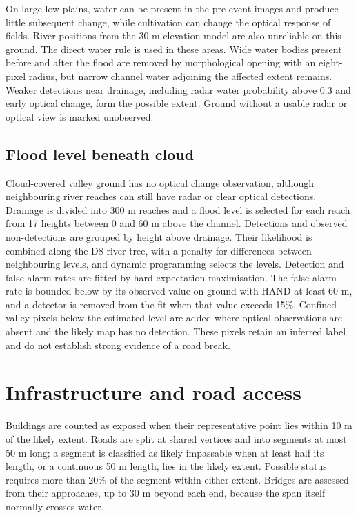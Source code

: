 \documentclass[10pt,twocolumn,letterpaper]{article}
\begin{document}
On large low plains, water can be present in the pre-event images and produce little subsequent
change, while cultivation can change the optical response of fields. River positions from the 30 m
elevation model are also unreliable on this ground. The direct water rule is used in these areas.
Wide water bodies present before and after the flood are removed by morphological opening with an
eight-pixel radius, but narrow channel water adjoining the affected extent remains. Weaker
detections near drainage, including radar water probability above 0.3 and early optical change, form
the possible extent. Ground without a usable radar or optical view is marked unobserved.

\subsection{Flood level beneath cloud}
Cloud-covered valley ground has no optical change observation, although neighbouring river reaches
can still have radar or clear optical detections. Drainage is divided into 300 m reaches and a flood
level is selected for each reach from 17 heights between 0 and 60 m above the channel. Detections
and observed non-detections are grouped by height above drainage. Their likelihood is combined along
the D8 river tree, with a penalty for differences between neighbouring levels, and dynamic
programming selects the levels. Detection and false-alarm rates are fitted by hard
expectation-maximisation. The false-alarm rate is bounded below by its observed value on ground with
HAND at least 60 m, and a detector is removed from the fit when that value exceeds 15\%.
Confined-valley pixels below the estimated level are added where optical observations are absent and
the likely map has no detection. These pixels retain an inferred label and do not establish strong
evidence of a road break.

\section{Infrastructure and road access}
Buildings are counted as exposed when their representative point lies within 10 m of the likely
extent. Roads are split at shared vertices and into segments at most 50 m long; a segment is
classified as likely impassable when at least half its length, or a continuous 50 m length, lies in
the likely extent. Possible status requires more than 20\% of the segment within either extent.
Bridges are assessed from their approaches, up to 30 m beyond each end, because the span itself
normally crosses water.
\end{document}
